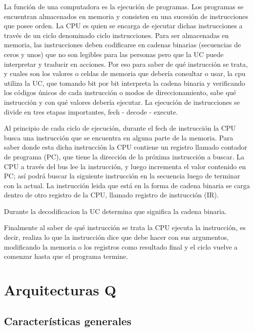 La función de una computadora es la ejecución de programas. Los programas se encuentran almacenados en memoria y consisten en una sucesión de instrucciones que posee orden. La CPU es quien se encarga de ejecutar dichas instrucciones a través de un ciclo denominado ciclo instrucciones. Para ser almacenadas en memoria, las instrucciones deben codificarse en cadenas binarias (secuencias de ceros y unos) que no son legibles para las personas pero que la UC puede interpretar y traducir en acciones. Por eso para saber de qué instrucción se trata, y cuales son los valores o celdas de memoria que debería consultar o usar, la cpu utiliza la UC, que tomando bit por bit interpreta la cadena binaria y verificando los códigos únicos de cada instrucción o modos de direccionamiento, sabe qué instrucción y con qué valores debería ejecutar. La ejecución de instrucciones se divide en tres etapas importantes, fech - decode - execute.

Al principio de cada ciclo de ejecución, durante el fech de instrucción la CPU busca una instrucción que se encuentra en alguna parte de la memoria. Para saber donde esta dicha instrucción la CPU contiene un registro llamado contador de programa (PC), que tiene la dirección de la próxima instrucción a buscar. La CPU a través del bus lee la instrucción, y luego incrementa el valor contenido en PC; así podrá buscar la siguiente instrucción en la secuencia luego de terminar con la actual. La instrucción leida que está en la forma de cadena binaria se carga dentro de otro registro de la CPU, llamado registro de instrucción (IR).

Durante la decodificacion la UC determina que significa la cadena binaria.

Finalmente al saber de qué instrucción se trata la CPU ejecuta la instrucción, es decir, realiza lo que la instrucción dice que debe hacer con sus argumentos, modificando la memoria o los registros como resultado final y el ciclo vuelve a comenzar hasta que el programa termine.

\section{Arquitecturas Q}

\subsection{Características generales} \label{caracteristicasQ}

